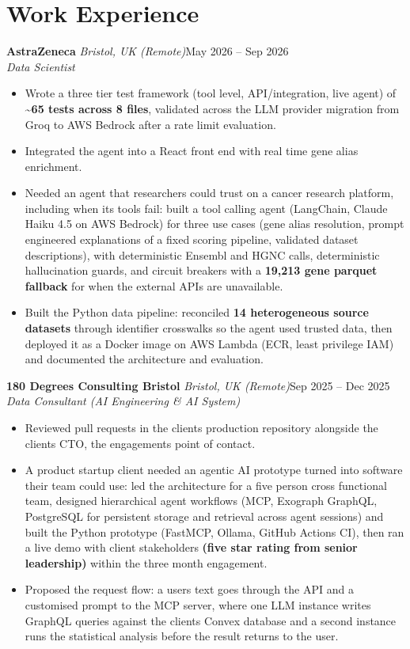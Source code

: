 \documentclass[a4paper,11pt]{article}
\newcommand{\role}[4]{%
  \textbf{#1}{\color{muted}\,\textperiodcentered\,\textit{#2}}\hfill{\color{muted}#3}\\
  \textit{#4}\par}
\newcommand{\gap}{\vspace{5pt}}
\newcommand{\num}[1]{\textbf{#1}}   %
\begin{document}
\section{Work Experience}
\role{AstraZeneca}{Bristol, UK (Remote)}{May 2026 – Sep 2026}{Data Scientist}
\begin{itemize}
  \item Wrote a three tier test framework (tool level, API/integration, live agent) of \num{\textasciitilde{}65 tests across 8 files}, validated across the LLM provider migration from Groq to AWS Bedrock after a rate limit evaluation.
  \item Integrated the agent into a React front end with real time gene alias enrichment.
  \item Needed an agent that researchers could trust on a cancer research platform, including when its tools fail: built a tool calling agent (LangChain, Claude Haiku 4.5 on AWS Bedrock) for three use cases (gene alias resolution, prompt engineered explanations of a fixed scoring pipeline, validated dataset descriptions), with deterministic Ensembl and HGNC calls, deterministic hallucination guards, and circuit breakers with a \num{19,213 gene parquet fallback} for when the external APIs are unavailable.
  \item Built the Python data pipeline: reconciled \num{14 heterogeneous source datasets} through identifier crosswalks so the agent used trusted data, then deployed it as a Docker image on AWS Lambda (ECR, least privilege IAM) and documented the architecture and evaluation.
\end{itemize}
\gap
{}
\role{180 Degrees Consulting Bristol}{Bristol, UK (Remote)}{Sep 2025 – Dec 2025}{Data Consultant (AI Engineering \& AI System)}
\begin{itemize}
  \item Reviewed pull requests in the client\textquotesingle{}s production repository alongside the client\textquotesingle{}s CTO, the engagement\textquotesingle{}s point of contact.
  \item A product startup client needed an agentic AI prototype turned into software their team could use: led the architecture for a five person cross functional team, designed hierarchical agent workflows (MCP, Exograph GraphQL, PostgreSQL for persistent storage and retrieval across agent sessions) and built the Python prototype (FastMCP, Ollama, GitHub Actions CI), then ran a live demo with client stakeholders \num{(five star rating from senior leadership)} within the three month engagement.
  \item Proposed the request flow: a user\textquotesingle{}s text goes through the API and a customised prompt to the MCP server, where one LLM instance writes GraphQL queries against the client\textquotesingle{}s Convex database and a second instance runs the statistical analysis before the result returns to the user.
\end{itemize}
\end{document}
